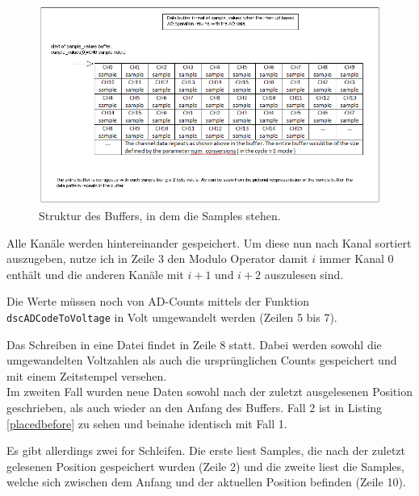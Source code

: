\documentclass[12pt,a4paper]{scrartcl}
\begin{document}
\begin{figure}[H]
\centering
\includegraphics[scale=.55]{samplebuffer.png}
\caption{Struktur des Buffers, in dem die Samples stehen. \citep{Systems:2008uq}}
\label{samplebuffer}
\end{figure}

Alle Kanäle werden hintereinander gespeichert. Um diese nun nach Kanal sortiert auszugeben, nutze ich in Zeile 3 den Modulo Operator damit $i$ immer Kanal 0 enthält und die anderen Kanäle mit $i+1$ und $i+2$ auszulesen sind.

Die Werte müssen noch von AD-Counts mittels der Funktion \texttt{dscADCodeToVoltage} in Volt umgewandelt werden (Zeilen 5 bis 7).

Das Schreiben in eine Datei findet in Zeile 8 statt. Dabei werden sowohl die umgewandelten Voltzahlen als auch die ursprünglichen Counts gespeichert und mit einem Zeitstempel versehen. \\

Im zweiten Fall wurden neue Daten sowohl nach der zuletzt ausgelesenen Position geschrieben, als auch wieder an den Anfang des Buffers. Fall 2 ist in Listing \ref{placedbefore} zu sehen und beinahe identisch mit Fall 1. 

Es gibt allerdings zwei for Schleifen. Die erste liest Samples, die nach der zuletzt gelesenen Position gespeichert wurden (Zeile 2) und die zweite liest die Samples, welche sich zwischen dem Anfang und der aktuellen Position befinden (Zeile 10).
					
\end{document}
